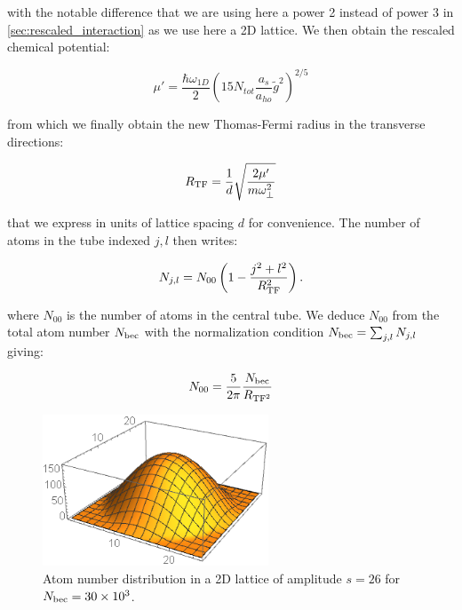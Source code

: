 \noindent with the notable difference that we are using here a power 2 instead of power 3 in \ref{sec:rescaled_interaction} as we use here a 2D lattice. We then obtain the rescaled chemical potential:

\begin{equation}
    \mu' = \frac{\hbar \omega_{1D}}{2} \left( 15 N_{tot} \frac{a_s}{a_{ho}} \tilde{g}^2 \right)^{2/5}
\end{equation}

\noindent from which we finally obtain the new Thomas-Fermi radius in the transverse directions:

\begin{equation}
    R_{\rm{TF}} = \frac{1}{d} \sqrt{\frac{2 \mu'}{m \omega_{\perp}^2}}
\end{equation}

\noindent that we express in units of lattice spacing $d$ for convenience. The number of atoms in the tube indexed $j,l$ then writes:

\begin{equation}\label{eq:N_per_tube}
    N_{j,l} = N_{00} \left( 1 - \frac{j^2 + l^2}{R_{\rm{TF}}^2} \right) .
\end{equation}

\noindent where $N_{00}$ is the number of atoms in the central tube. We deduce $N_{00}$ from the total atom number $N_{\rm{bec}}$ with the normalization condition $N_{\rm{bec}} = \sum_{j,l} N_{j,l}$ giving:

\begin{equation}
    N_{00} = \frac{5}{2 \pi} \frac{N_{\rm{bec}}}{R_{\rm{TF}^2}}
\end{equation}

\begin{figure}
    \centering
    \includegraphics[width=0.6\textwidth]{Fig/Chapter5/atomic_distrib_2Dlatt.PNG}
    \caption{Atom number distribution in a 2D lattice of amplitude $s=26$ for $N_{\rm{bec}}=30 \times 10^3$.}
    \label{fig:my_label}
\end{figure}

